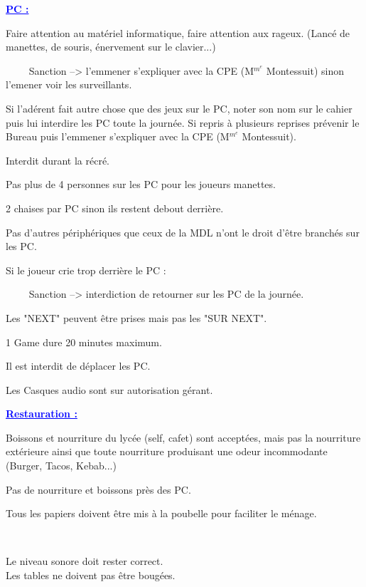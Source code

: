 \documentclass[12pt,a4paper]{article}
\begin{document}
\begin{PC}{\textcolor{blue}{\Large{\underline{\textbf{PC :}}}}} \\ \par
{} Faire attention au matériel informatique, faire attention aux rageux. (Lancé de manettes, de souris, énervement sur le clavier...)\par
~~~~ Sanction --> l'emmener s'expliquer avec la CPE (M$^m^e$ Montessuit) sinon l'emener voir les surveillants.\par
{} Si l'adérent fait autre chose que des jeux sur le PC, noter son nom sur le cahier puis lui interdire les PC toute la journée. Si repris à plusieurs reprises prévenir le Bureau puis l'emmener s'expliquer avec la CPE (M$^m^e$ Montessuit).\par
{} Interdit durant la récré.\par
{} Pas plus de 4 personnes sur les PC pour les joueurs manettes.\par
{} 2 chaises par PC sinon ils restent debout derrière.\par
{} Pas d'autres périphériques que ceux de la MDL n'ont le droit d'\^etre branchés sur les PC. \par
{} Si le joueur crie trop derrière le PC :\par
~~~~ Sanction --> interdiction de retourner sur les PC de la journée. \par
{} Les "NEXT" peuvent \^etre prises mais pas les "SUR NEXT". \par
{} 1 Game dure 20 minutes maximum. \par
{} Il est interdit de déplacer les PC. \par
{} Les Casques audio sont sur autorisation gérant. \par
\end{PC} 
    \vspace{0.5 cm}
\begin{Restauration}{\textcolor{blue}{\underline{\Large{\textbf{Restauration :}}}}} \\ \par
{}Boissons et nourriture du lycée (self, cafet) sont acceptées, mais pas la nourriture extérieure ainsi que toute nourriture produisant une odeur incommodante (Burger, Tacos, Kebab...)\par
{}Pas de nourriture et boissons  près des PC.\par
{}Tous les papiers doivent \^etre mis à la poubelle pour faciliter le ménage.\par
\end{Restauration} \\ 
    \vspace{0.5 cm}
\begin{Autre}
 Le niveau sonore doit rester correct.\\
 Les tables ne doivent pas \^etre bougées.\\
\end{Autre} \\ \par
\end{document}
